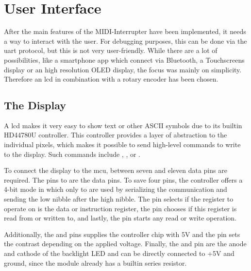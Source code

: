 \setchapterpreamble[u]{\margintoc}

\chapter{User Interface}
\label{ch:user-interface}

After the main features of the MIDI-Interrupter have been implemented, it needs a way to interact with the user. For debugging purposes, this can be done via the \gls{uart} protocol, but this is not very user-friendly. While there are a lot of possibilities, like a smartphone app which connect via Bluetooth, a Touchscreens display or an high resolution OLED display, the focus was mainly on simplicity. Therefore an \gls{lcd} in combination with a rotary encoder has been chosen.

\section{The Display}

A \gls{lcd} makes it very easy to show text or other ASCII symbols due to its builtin HD44780U controller. This controller provides a layer of abstraction to the individual pixels, which makes it possible to send high-level commands to write to the display. Such commands include , , or .

To connect the display to the \gls{mcu}, between seven and eleven data pins are required. The pins  to  are the data pins. To save four pins, the controller offers a 4-bit mode in which only  to  are used by serializing the communication and sending the low nibble after the high nibble. The  pin selects if the register to operate on is the data or instruction register, the  pin chooses if this register is read from or written to, and lastly, the  pin starts any read or write operation.

Additionally, the  and  pins supplies the controller chip with 5V and the  pin sets the contrast depending on the applied voltage. Finally, the  and  pin are the anode and cathode of the backlight LED and can be directly connected to +5V and ground, since the module already has a builtin series resistor.


